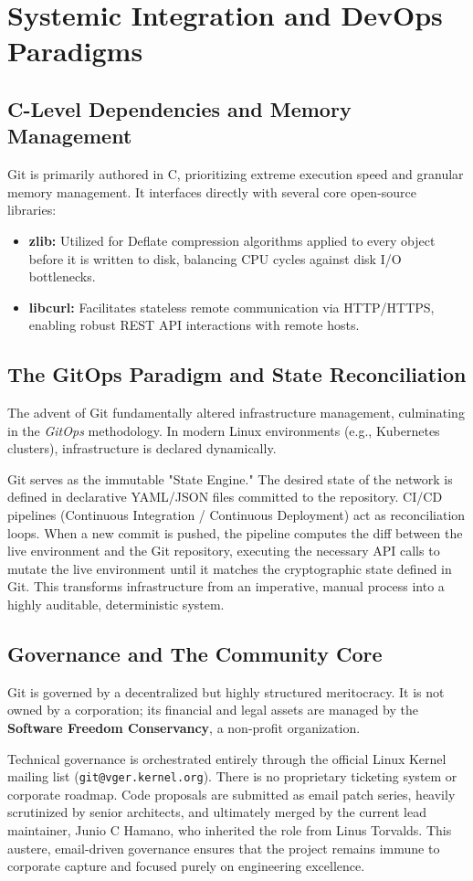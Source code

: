 \section{Systemic Integration and DevOps Paradigms}

\subsection{C-Level Dependencies and Memory Management}
Git is primarily authored in C, prioritizing extreme execution speed and granular memory management. It interfaces directly with several core open-source libraries:
\begin{itemize}
    \item \textbf{zlib:} Utilized for Deflate compression algorithms applied to every object before it is written to disk, balancing CPU cycles against disk I/O bottlenecks.
    \item \textbf{libcurl:} Facilitates stateless remote communication via HTTP/HTTPS, enabling robust REST API interactions with remote hosts.
\end{itemize}

\subsection{The GitOps Paradigm and State Reconciliation}
The advent of Git fundamentally altered infrastructure management, culminating in the \textit{GitOps} methodology. In modern Linux environments (e.g., Kubernetes clusters), infrastructure is declared dynamically. 

Git serves as the immutable "State Engine." The desired state of the network is defined in declarative YAML/JSON files committed to the repository. CI/CD pipelines (Continuous Integration / Continuous Deployment) act as reconciliation loops. When a new commit is pushed, the pipeline computes the diff between the live environment and the Git repository, executing the necessary API calls to mutate the live environment until it matches the cryptographic state defined in Git. This transforms infrastructure from an imperative, manual process into a highly auditable, deterministic system.

\newpage
\subsection{Governance and The Community Core}
Git is governed by a decentralized but highly structured meritocracy. It is not owned by a corporation; its financial and legal assets are managed by the \textbf{Software Freedom Conservancy}, a non-profit organization. 

Technical governance is orchestrated entirely through the official Linux Kernel mailing list (\texttt{git@vger.kernel.org}). There is no proprietary ticketing system or corporate roadmap. Code proposals are submitted as email patch series, heavily scrutinized by senior architects, and ultimately merged by the current lead maintainer, Junio C Hamano, who inherited the role from Linus Torvalds. This austere, email-driven governance ensures that the project remains immune to corporate capture and focused purely on engineering excellence.